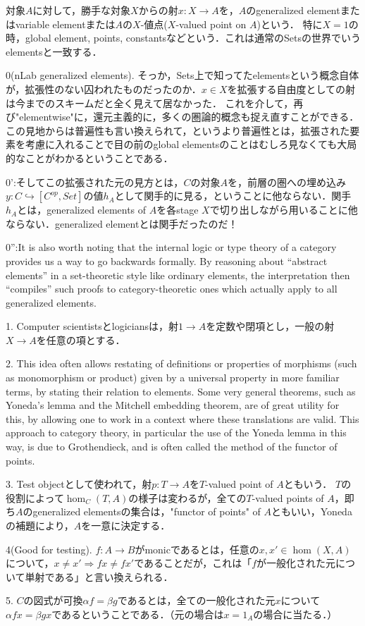 \documentclass[uplatex, dvipdfmx]{jsarticle}
\begin{document}
\begin{definition*}
    対象$A$に対して，勝手な対象$X$からの射$x:X\to A$を，$A$のgeneralized elementまたはvariable elementまたは$A$の$X$-値点($X$-valued point on $A$)という．
    特に$X=1$の時，global element, points, constantsなどという．これは通常のSetsの世界でいうelementsと一致する．
\end{definition*}
\begin{remark*}

    0(nLab generalized elements). そっか，Sets上で知ってたelementsという概念自体が，拡張性のない囚われたものだったのか．$x\in X$を拡張する自由度としての射は今までのスキームだと全く見えて居なかった．
    これを介して，再び"elementwise"に，還元主義的に，多くの圏論的概念も捉え直すことができる．この見地からは普遍性も言い換えられて，というより普遍性とは，拡張された要素を考慮に入れることで目の前のglobal elementsのことはむしろ見なくても大局的なことがわかるということである．

    0':そしてこの拡張された元の見方とは，$C$の対象$A$を，前層の圏への埋め込み$y:C\hookrightarrow [C^{op},Set]$の値$h_A$として関手的に見る，ということに他ならない．関手$h_A$とは，generalized elements of $A$を各stage $X$で切り出しながら用いることに他ならない．generalized elementとは関手だったのだ！

    0'':It is also worth noting that the internal logic or type theory of a category provides us a way to go backwards formally. By reasoning about “abstract elements” in a set-theoretic style like ordinary elements, the interpretation then “compiles” such proofs to category-theoretic ones which actually apply to all generalized elements.

    1. Computer scientistsとlogiciansは，射$1\to A$を定数や閉項とし，一般の射$X\to A$を任意の項とする．

    2. This idea often allows restating of definitions or properties of morphisms (such as monomorphism or product) given by a universal property in more familiar terms, by stating their relation to elements. Some very general theorems, such as Yoneda's lemma and the Mitchell embedding theorem, are of great utility for this, by allowing one to work in a context where these translations are valid. This approach to category theory, in particular the use of the Yoneda lemma in this way, is due to Grothendieck, and is often called the method of the functor of points.

    3. Test objectとして使われて，射$p:T\to A$を$T$-valued point of $A$ともいう．
    $T$の役割によって$\hom_C(T,A)$の様子は変わるが，全ての$T$-valued points of $A$，即ち$A$のgeneralized elementsの集合は，"functor of points" of $A$ともいい，Yonedaの補題により，$A$を一意に決定する．

    4(Good for testing). $f:A\to B$がmonicであるとは，任意の$x,x'\in\hom(X,A)$について，$x\ne x'\Rightarrow fx\ne fx'$であることだが，これは「$f$が一般化された元について単射である」と言い換えられる．

    5. $C$の図式が可換$\alpha f=\beta g$であるとは，全ての一般化された元$x$について$\alpha fx=\beta gx$であるということである．（元の場合は$x=1_A$の場合に当たる．）
\end{remark*}
\end{document}
